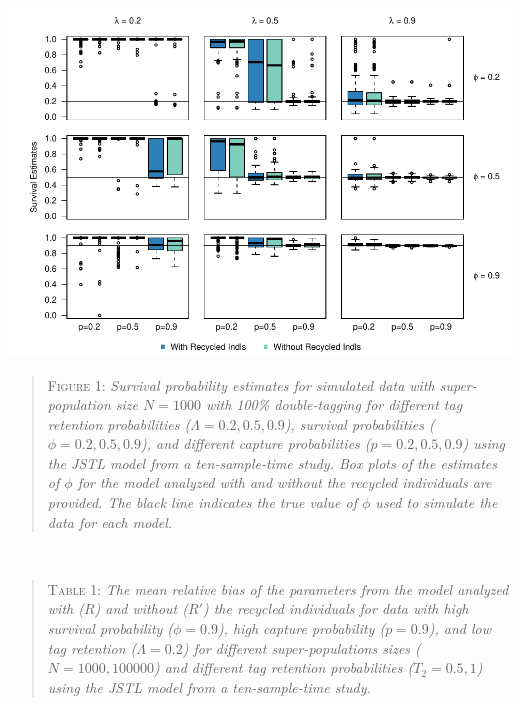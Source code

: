 \documentclass[]{article}
\begin{document}
\includegraphics{RecycledPaper_files/figure-latex/Figure1_survival_GJSTL1-1.pdf}

\begin{quote}
\textsc{Figure 1:}
\textsl{Survival probability estimates for simulated data with super-population size $N=1000$ with 100\% double-tagging for different tag retention probabilities ($\Lambda=0.2,0.5,0.9$), survival probabilities ($\phi=0.2,0.5,0.9$), and different capture probabilities ($p=0.2,0.5,0.9$) using the JSTL model from a ten-sample-time study. Box plots of the estimates of $\phi$ for the model analyzed with and without the recycled individuals are provided. The black line indicates the true value of $\phi$ used to simulate the data for each model.}
\end{quote}

~ ~

\begin{quote}
\textsc{Table 1:}
\textsl{The mean relative bias of the parameters from the model analyzed with ($R$) and without ($R'$) the recycled individuals for data with high survival probability ($\phi=0.9$), high capture probability ($p=0.9$), and low tag retention ($\Lambda=0.2$)  for different super-populations sizes ($N=1000,100 000$) and different tag retention probabilities ($T_2=0.5,1$) using the JSTL model from a ten-sample-time study. }
\end{quote}
\end{document}
